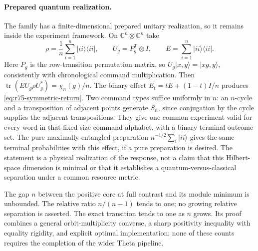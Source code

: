 \paragraph{Prepared quantum realization.}
The family has a finite-dimensional prepared unitary realization,
so it remains inside the experiment framework. On
$\mathbb C^n\otimes\mathbb C^n$ take
\[
 \rho=\frac1n\sum_{i=1}^n|ii\rangle\langle ii|,
 \qquad U_g=P_g^{\mathsf T}\otimes I,
 \qquad E=\sum_{i=1}^n|ii\rangle\langle ii|.
\]
Here $P_g$ is the row-transition permutation matrix, so
$U_g|x,y\rangle=|xg,y\rangle$, consistently with chronological
command multiplication. Then $\operatorname{tr}(E U_g\rho U_g^*)=\chi_n(g)/n$.
The binary effect $E_t=tE+(1-t)I/n$ produces
\eqref{eq:r75-symmetric-return}. Two command types suffice uniformly in
$n$: an $n$-cycle and a transposition of adjacent points generate $S_n$,
since conjugation by the cycle supplies the adjacent transpositions.
They give one common experiment valid for every word in that fixed-size
command alphabet, with a binary terminal outcome set.
The pure maximally entangled preparation
$n^{-1/2}\sum_i|ii\rangle$ gives the same terminal probabilities
with this effect, if a pure preparation is desired. The statement
is a physical realization of the response, not a claim that this
Hilbert-space dimension is minimal or that it establishes a
quantum-versus-classical separation under a common resource metric.

The gap $n$ between the positive core at full contrast and its
module minimum is unbounded. The relative ratio $n/(n-1)$ tends
to one; no growing relative separation is asserted. The exact
transition tends to one as $n$ grows. Its proof combines a general
orbit-multiplicity converse, a sharp positivity inequality with
equality rigidity, and explicit optimal implementation; none of
these counts requires the completion of the wider Theta pipeline.
